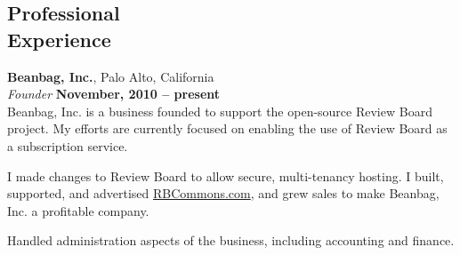 \documentclass[margin,line]{resume}
\begin{document}
\begin{resume}
    \section{\mysidestyle Professional\\Experience}

    {\bf Beanbag, Inc.}, Palo Alto, California \vspace{2mm}\\\vspace{1mm}%
    {\sl Founder} \hfill {\bf November, 2010 -- present }\\
    Beanbag, Inc. is a business founded to support the open-source Review Board
    project. My efforts are currently focused on enabling the use of Review
    Board as a subscription service.
    \begin{list1}
    \item I made changes to Review Board to allow secure, multi-tenancy hosting.
          I built, supported, and advertised \url{RBCommons.com}, and grew sales
          to make Beanbag, Inc. a profitable company.
    \item Handled administration aspects of the business, including accounting
          and finance.
    \end{list1}


\end{resume}
\end{document}
